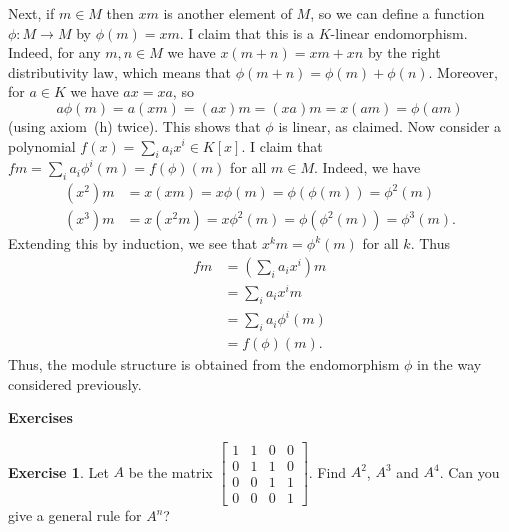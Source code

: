 \documentclass{amsart}
\newcommand{\bsm}       {\left[\begin{smallmatrix}}
\newcommand{\esm}       {\end{smallmatrix}\right]}
\newcommand{\xra}       {\xrightarrow}
\newcommand{\ip}[1]     {\langle #1\rangle}
\renewcommand{\:}{\colon}
\theoremstyle{definition}
\newtheorem{exercise}{Exercise}[section]
\begin{document}
Next, if $m\in M$ then $xm$ is another element of $M$, so we can
define a function $\phi\:M\xra{}M$ by $\phi(m)=xm$.  I claim that this
is a $K$-linear endomorphism.  Indeed, for any $m,n\in M$ we have
$x(m+n)=xm+xn$ by the right distributivity law, which means that
$\phi(m+n)=\phi(m)+\phi(n)$.  Moreover, for $a\in K$ we have $ax=xa$,
so 
\[ a\phi(m) = a(xm) = (ax)m = (xa)m =x(am) = \phi(am) \]
(using axiom~(h) twice).  This shows that $\phi$ is linear, as
claimed.  Now consider a polynomial $f(x)=\sum_i a_ix^i\in K[x]$.  I
claim that $fm=\sum_i a_i\phi^i(m)=f(\phi)(m)$ for all $m\in M$.
Indeed, we have
\begin{align*}
 (x^2)m &= x(xm)=x\phi(m)=\phi(\phi(m)) = \phi^2(m) \\
 (x^3)m &= x(x^2m)=x\phi^2(m)=\phi(\phi^2(m))=\phi^3(m).
\end{align*}
Extending this by induction, we see that $x^km=\phi^k(m)$ for all
$k$.  Thus
\begin{align*}
 fm &= (\sum_i a_i x^i)m \\
    &= \sum_i a_i x^im \\
    &= \sum_i a_i\phi^i(m) \\
    &= f(\phi)(m). 
\end{align*}
Thus, the module structure is obtained from the endomorphism $\phi$ in
the way considered previously.


\begin{center}
 \Large \textbf{Exercises}
\end{center}

\begin{exercise}
 Let $A$ be the matrix $\bsm 1&1&0&0\\0&1&1&0\\0&0&1&1\\0&0&0&1\esm$.
 Find $A^2$, $A^3$ and $A^4$.  Can you give a general rule for $A^n$?
\end{exercise}
\end{document}
